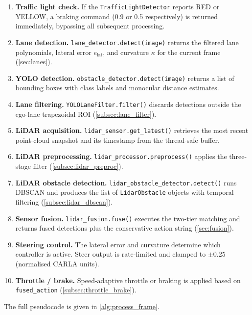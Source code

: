 \documentclass[12pt,a4paper]{article}
\begin{document}
\begin{enumerate}[label=\textbf{Step \arabic*.}, leftmargin=3em, itemsep=2pt]
  \item \textbf{Traffic light check.}
        If the \texttt{TrafficLightDetector} reports RED or YELLOW, a braking
        command (0.9 or 0.5 respectively) is returned immediately, bypassing
        all subsequent processing.
  \item \textbf{Lane detection.}
        \texttt{lane\_detector.detect(image)} returns the filtered lane
        polynomials, lateral error $e_\text{lat}$, and curvature $\kappa$ for
        the current frame (\cref{sec:lanes}).
  \item \textbf{YOLO detection.}
        \texttt{obstacle\_detector.detect(image)} returns a list of bounding
        boxes with class labels and monocular distance estimates.
  \item \textbf{Lane filtering.}
        \texttt{YOLOLaneFilter.filter()} discards detections outside the
        ego-lane trapezoidal ROI (\cref{subsec:lane_filter}).
  \item \textbf{LiDAR acquisition.}
        \texttt{lidar\_sensor.get\_latest()} retrieves the most recent
        point-cloud snapshot and its timestamp from the thread-safe buffer.
  \item \textbf{LiDAR preprocessing.}
        \texttt{lidar\_processor.preprocess()} applies the three-stage filter
        (\cref{subsec:lidar_preproc}).
  \item \textbf{LiDAR obstacle detection.}
        \texttt{lidar\_obstacle\_detector.detect()} runs DBSCAN and produces
        the list of \texttt{LidarObstacle} objects with temporal filtering
        (\cref{subsec:lidar_dbscan}).
  \item \textbf{Sensor fusion.}
        \texttt{lidar\_fusion.fuse()} executes the two-tier matching and
        returns fused detections plus the conservative action string
        (\cref{sec:fusion}).
  \item \textbf{Steering control.}
        The lateral error and curvature determine which controller is active.
        Steer output is rate-limited and clamped to $\pm0.25$ (normalised
        CARLA units).
  \item \textbf{Throttle / brake.}
        Speed-adaptive throttle or braking is applied based on
        \texttt{fused\_action} (\cref{subsec:throttle_brake}).
\end{enumerate}

The full pseudocode is given in \cref{alg:process_frame}.
\end{document}
